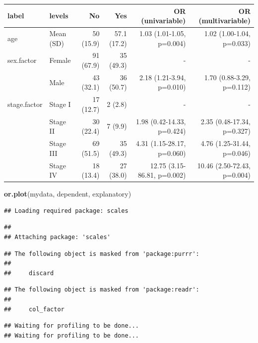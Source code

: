 \documentclass[]{book}
\makeatletter
\newenvironment{Shaded}{\begin{snugshade}}{\end{snugshade}}
\newcommand{\KeywordTok}[1]{\textcolor[rgb]{0.13,0.29,0.53}{\textbf{#1}}}
\newcommand{\NormalTok}[1]{#1}
\newenvironment{kframe}{%
\medskip{}
\setlength{\fboxsep}{.8em}
 \def\at@end@of@kframe{}%
 \ifinner\ifhmode%
  \def\at@end@of@kframe{\end{minipage}}%
  \begin{minipage}{\columnwidth}%
 \fi\fi%
 \def\FrameCommand##1{\hskip\@totalleftmargin \hskip-\fboxsep
 \colorbox{shadecolor}{##1}\hskip-\fboxsep
     \hskip-\linewidth \hskip-\@totalleftmargin \hskip\columnwidth}%
 \MakeFramed {\advance\hsize-\width
   \@totalleftmargin\z@ \linewidth\hsize
   \@setminipage}}%
 {\par\unskip\endMakeFramed%
 \at@end@of@kframe}
\renewenvironment{Shaded}{\begin{kframe}}{\end{kframe}}
\makeatother
\begin{document}
\begin{tabular}{l|l|r|r|r|r}
\hline
label & levels & No & Yes & OR (univariable) & OR (multivariable)\\
\hline
age & Mean (SD) & 50 (15.9) & 57.1 (17.2) & 1.03 (1.01-1.05, p=0.004) & 1.02 (1.00-1.04, p=0.033)\\
\hline
sex.factor & Female & 91 (67.9) & 35 (49.3) & - & -\\
\hline
 & Male & 43 (32.1) & 36 (50.7) & 2.18 (1.21-3.94, p=0.010) & 1.70 (0.88-3.29, p=0.112)\\
\hline
stage.factor & Stage I & 17 (12.7) & 2 (2.8) & - & -\\
\hline
 & Stage II & 30 (22.4) & 7 (9.9) & 1.98 (0.42-14.33, p=0.424) & 2.35 (0.48-17.34, p=0.327)\\
\hline
 & Stage III & 69 (51.5) & 35 (49.3) & 4.31 (1.15-28.17, p=0.060) & 4.76 (1.25-31.44, p=0.046)\\
\hline
 & Stage IV & 18 (13.4) & 27 (38.0) & 12.75 (3.15-86.81, p=0.002) & 10.46 (2.50-72.43, p=0.004)\\
\hline
\end{tabular}

\begin{Shaded}
\begin{Highlighting}[]
\KeywordTok{or.plot}\NormalTok{(mydata, dependent, explanatory)}
\end{Highlighting}
\end{Shaded}

\begin{verbatim}
## Loading required package: scales
\end{verbatim}

\begin{verbatim}
## 
## Attaching package: 'scales'
\end{verbatim}

\begin{verbatim}
## The following object is masked from 'package:purrr':
## 
##     discard
\end{verbatim}

\begin{verbatim}
## The following object is masked from 'package:readr':
## 
##     col_factor
\end{verbatim}

\begin{verbatim}
## Waiting for profiling to be done...
## Waiting for profiling to be done...
\end{verbatim}
\end{document}
